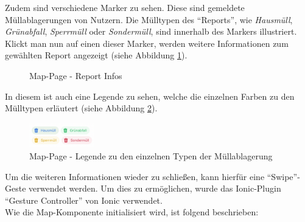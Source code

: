 \documentclass[a4paper, 11pt, DIV=11, listof=numbered, numbers=noenddot]{scrartcl}
\begin{document}
	Zudem sind verschiedene Marker zu sehen. Diese sind gemeldete Müllablagerungen von Nutzern. Die Mülltypen des \enquote{Reports}, wie \textit{Hausmüll}, \textit{Grünabfall}, \textit{Sperrmüll} oder \textit{Sondermüll}, sind innerhalb des Markers illustriert. 
	Klickt man nun auf einen dieser Marker, werden weitere Informationen zum gewählten Report angezeigt (siehe Abbildung \ref{fig:app-map-report}).
	\begin{figure}[!htbp]
		\centering
		\hfill%
		\hfill%
		\caption{Map-Page - Report Infos}\label{fig:app-map-report}
	\end{figure}
	In diesem ist auch eine Legende zu sehen, welche die einzelnen Farben zu den Mülltypen erläutert (siehe Abbildung \ref{fig:legend}).
	\begin{figure}[!htbp]
		\centering
		\includegraphics[width=0.25\textwidth]{img/app/legend.png}
		\caption{Map-Page - Legende zu den einzelnen Typen der Müllablagerung}\label{fig:legend}
	\end{figure}
	Um die weiteren Informationen wieder zu schließen, kann hierfür eine \enquote{Swipe}-Geste verwendet werden. Um dies zu ermöglichen, wurde das Ionic-Plugin \enquote{Gesture Controller} von Ionic verwendet.\\
	Wie die Map-Komponente initialisiert wird, ist folgend beschrieben:\\
\end{document}

